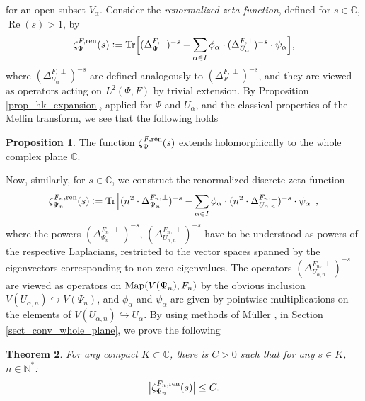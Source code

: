 \documentclass[12pt]{article}
\numberwithin{equation}{section}
\theoremstyle{theorem}
\newtheorem{thm}{Theorem}[section]
\theoremstyle{definition}
\newtheorem{prop}[thm]{Proposition}
\theoremstyle{remark}
\newcommand{\comp}{\mathbb{C}}
\newcommand{\nat}{\mathbb{N}}
\newcommand{\laplcomp}{\Delta}
\renewcommand{\Re}{\operatorname{Re}}
\begin{document}
	for an open subset $V_{\alpha}$.
	Consider the \textit{renormalized zeta function}, defined for $s \in \comp$, $\Re(s) > 1$, by 
	\begin{equation}\label{eq_zeta_renorm}
		\zeta^{F, {\rm{ren}}}_{\Psi}(s) 
		:= 
		{\rm{Tr}} \Big[  (\laplcomp_{\Psi}^{F, \perp})^{-s} 
		- 
		\sum_{\alpha \in I} \phi_{\alpha} \cdot (\laplcomp_{U_{\alpha}}^{F, \perp})^{-s} \cdot \psi_{\alpha} \Big],
	\end{equation}
	where $(\laplcomp_{U_{\alpha}}^{F, \perp})^{-s}$ are defined analogously to $(\laplcomp_{\Psi}^{F, \perp})^{-s}$, and they are viewed as operators acting on $L^2(\Psi, F)$ by trivial extension.
	By Proposition \ref{prop_hk_expansion}, applied for $\Psi$ and $U_{\alpha}$, and the classical properties of the Mellin transform, we see that the following holds
	\begin{prop}\label{prop_zeta_ren_hol}
		The function $\zeta^{F, {\rm{ren}}}_{\Psi}(s)$ extends holomorphically to the whole complex plane $\comp$.
	\end{prop}
	\par Now, similarly, for $s \in \comp$, we construct the renormalized discrete zeta function
	\begin{equation}\label{eq_zeta_renorm_discr}
		\zeta^{F_n, {\rm{ren}}}_{\Psi_n}(s) := {\rm{Tr}} \Big[  (n^2 \cdot\laplcomp_{\Psi_n}^{F_n, \perp})^{-s} - \sum_{\alpha \in I} \phi_{\alpha} \cdot (n^2 \cdot  \laplcomp_{U_{\alpha, n}}^{F_n, \perp})^{-s} \cdot \psi_{\alpha} \Big],
	\end{equation}
	where the powers $(\laplcomp_{\Psi_n}^{F_n, \perp})^{-s}$, $(\laplcomp_{U_{\alpha, n}}^{F_n, \perp})^{-s}$ have to be understood as powers of the respective Laplacians, restricted to the vector spaces spanned by the eigenvectors corresponding to non-zero eigenvalues.
	The operators $(\laplcomp_{U_{\alpha, n}}^{F_n, \perp})^{-s}$ are viewed as operators on ${\rm{Map}}(V(\Psi_n), F_n)$ by the obvious inclusion $V(U_{\alpha, n}) \hookrightarrow V(\Psi_n)$, and $\phi_{\alpha}$ and $\psi_{\alpha}$ are given by pointwise multiplications on the elements of $V(U_{\alpha, n}) \hookrightarrow U_{\alpha}$.
	By using methods of Müller \cite{Mull78}, in Section \ref{sect_conv_whole_plane}, we prove the following 
	\begin{thm}\label{thm_bound_zeta}
		For any compact $K \subset \comp$, there is $C > 0$ such that for any $s \in K$, $n \in \nat^*$:
		\begin{equation}
			\big| \zeta^{F_n, {\rm{ren}}}_{\Psi_n}(s) \big| \leq C.
		\end{equation}
	\end{thm}
\end{document}
